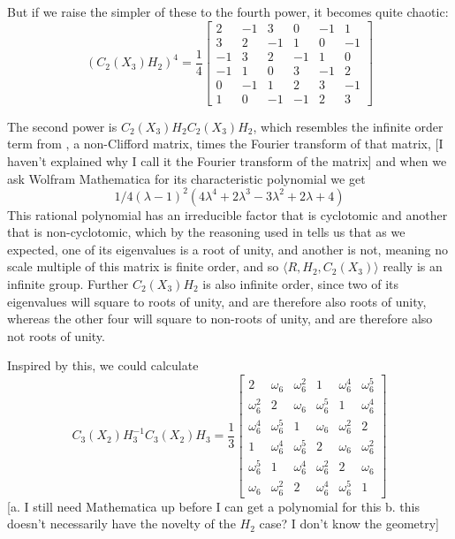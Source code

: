 But if we raise the simpler of these to the fourth power, it becomes quite chaotic:
\[\left(C_2(X_3)H_2\right)^4 =
\frac{1}{4}
\begin{bmatrix}
	2&-1&3&0&-1&1\\ 
	3&2&-1&1&0&-1\\ 
	-1&3&2&-1&1&0\\ 
	-1&1&0&3&-1&2\\ 
	0&-1&1&2&3&-1\\ 
	1&0&-1&-1&2&3
\end{bmatrix}
\]

The second power is $C_2(X_3)H_2C_2(X_3)H_2$, which resembles the infinite order term from \cite{universal-qubit}, a non-Clifford matrix, times the Fourier transform of that matrix, [I haven't explained why I call it the Fourier transform of the matrix] and when we ask Wolfram Mathematica for its characteristic polynomial we get
\[1/4 (\lambda - 1)^2 (4 \lambda^4 + 2 \lambda^3 - 3 \lambda^2 + 2 \lambda + 4)\]
This rational polynomial has an irreducible factor that is cyclotomic and another that is non-cyclotomic, which by the reasoning used in \cite{universal-qubit} tells us that as we expected, one of its eigenvalues is a root of unity, and another is not, meaning no scale multiple of this matrix is finite order, and so $\langle R, H_2, C_2(X_3) \rangle$ really is an infinite group. Further $C_2(X_3)H_2$ is also infinite order, since two of its eigenvalues will square to roots of unity, and are therefore also roots of unity, whereas the other four will square to non-roots of unity, and are therefore also not roots of unity.

Inspired by this, we could calculate
\[C_3(X_2) H_3^{-1} C_3(X_2) H_3 =
\frac{1}{3} \begin{bmatrix}
	2 & \omega_6 & \omega_6^2 & 1 & \omega_6^4 & \omega_6^5 \\
	\omega_6^2 & 2 & \omega_6 & \omega_6^5 & 1 & \omega_6^4 \\
	\omega_6^4 & \omega_6^5 & 1 & \omega_6 & \omega_6^2 & 2 \\
	1 & \omega_6^4 & \omega_6^5 & 2 & \omega_6 & \omega_6^2 \\
	\omega_6^5 & 1 & \omega_6^4 & \omega_6^2 & 2 & \omega_6 \\
	\omega_6 & \omega_6^2 & 2 & \omega_6^4 & \omega_6^5 & 1
\end{bmatrix}
\]
[a. I still need Mathematica up before I can get a polynomial for this b. this doesn't necessarily have the novelty of the $H_2$ case? I don't know the geometry]

